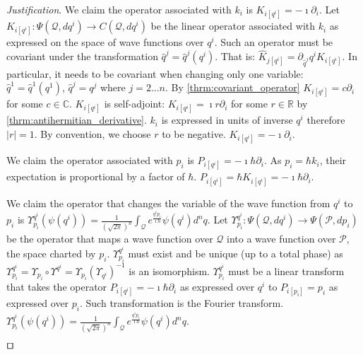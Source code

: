 \documentclass[smallextended]{svjour3}
\numberwithin{equation}{section}
\newenvironment{justification}{\emph{Justification}.}{\hfill\(\qed\)}
\theoremstyle{definition}
\newenvironment{justification}{\emph{Justification}.}{\qed}
\begin{document}
\begin{justification}
	We claim the operator associated with $k_i$ is $K_{i [q^i]} = - \imath \partial_{i}$. Let $K_{i [q^i]} : \Psi(\mathcal{Q}, dq^i) \rightarrow C(\mathcal{Q}, dq^i)$ be the linear operator associated with $k_i$ as expressed on the space of wave functions over $q^i$. Such an operator must be covariant under the transformation $\hat{q}^j = \hat{q}^j(q^i)$. That is: $\hat{K}_{j [q^i]} = \partial_{\hat{q}^j}q^iK_{i [q^i]}$. In particular, it needs to be covariant when changing only one variable: $\hat{q}^1 = \hat{q}^1(q^1)$, $\hat{q}^j = q^j$ where $j=2...n$. By \ref{thrm:covariant_operator} $K_{i [q^i]}=c\partial_i$ for some $c \in \mathbb{C}$. $K_{i [q^i]}$ is self-adjoint: $K_{i  [q^i]}=\imath r\partial_i$ for some $r \in \mathbb{R}$ by \ref{thrm:antihermitian_derivative}. $k_i$ is expressed in units of inverse $q^i$ therefore $|r|=1$. By convention, we choose $r$ to be negative. $K_{i [q^i]} = - \imath \partial_{i}$.
	
	We claim the operator associated with $p_i$ is $P_{i [q^i]} = - \imath \hbar \partial_{i}$. As $p_i=\hbar k_i$, their expectation is proportional by a factor of $\hbar$. $P_{i [q^i]}=\hbar K_{i [q^i]}= -\imath \hbar \partial_i$.
	
	We claim the operator that changes the variable of the wave function from $q^i$ to $p_i$ is $\Upsilon^{q^i}_{p_i} (\psi(q^i)) = \frac{1}{(\sqrt{2\pi})^n} \int_{\mathcal{Q}} e^{\frac{q^i p_i }{\imath \hbar}} \psi(q^i) d^n q $. Let $\Upsilon^{q^i}_{p_i} : \Psi(\mathcal{Q}, dq^i) \rightarrow \Psi(\mathcal{P}, dp_i)$ be the operator that maps a wave function over $\mathcal{Q}$ into a wave function over $\mathcal{P}$, the space charted by $p_i$. $\Upsilon^{q^i}_{p_i}$ must exist and be unique (up to a total phase) as $\Upsilon^{q^i}_{p_i} = \Upsilon_{p_i}\circ\Upsilon^{q^i} = \Upsilon_{p_i}(\Upsilon_{q^i})^{-1}$ is an isomorphism. $\Upsilon^{q^i}_{p_i}$ must be a linear transform that takes the operator $P_{i [q^i]}= - \imath \hbar \partial_i$ as expressed over $q^i$ to $P_{i [p_i]} = p_i$ as expressed over $p_i$. Such transformation is the Fourier transform. $\Upsilon^{q^i}_{p_i} (\psi(q^i)) = \frac{1}{(\sqrt{2\pi})^n} \int_{\mathcal{Q}} e^{\frac{q^i p_i }{\imath \hbar}} \psi(q^i) d^n q $.
	

\end{justification}
\end{document}
